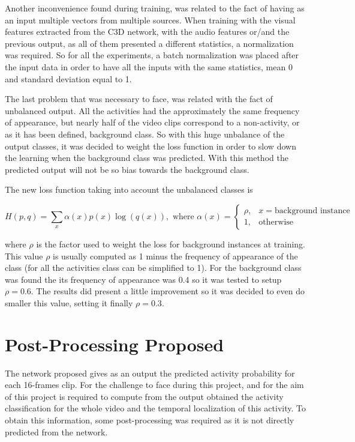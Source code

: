 Another inconvenience found during training, was related to the fact of having as an input multiple vectors from multiple sources. When training with the visual features extracted from the C3D network, with the audio features or/and the previous output, as all of them presented a different statistics, a normalization was required. So for all the experiments, a batch normalization\cite{ioffe2015batch} was placed after the input data in order to have all the inputs with the same statistics, mean 0 and standard deviation equal to 1. 

The last problem that was necessary to face, was related with the fact of unbalanced output. All the activities had the approximately the same frequency of appearance, but nearly half of the video clips correspond to a non-activity, or as it has been defined, background class. So with this huge unbalance of the output classes, it was decided to weight the loss function in order to slow down the learning when the background class was predicted. With this method the predicted output will not be so bias towards the background class.

The new loss function taking into account the unbalanced classes is

\begin{equation}
	H(p,q) = \sum_x \alpha(x) p(x) \log (q(x)), \text{ where } \alpha(x) = 
    \begin{cases}
        \rho, & x = \text{background instance}\\
        1,    & \text{otherwise}
    \end{cases}
\end{equation}

where $\rho$ is the factor used to weight the loss for background instances at training. This value $\rho$ is usually computed as 1 minus the frequency of appearance of the class (for all the activities class can be simplified to 1). For the background class was found the its frequency of appearance was 0.4 so it was tested to setup $\rho = 0.6$. The results did present a little improvement so it was decided to even do smaller this value, setting it finally $\rho = 0.3$.

\section{Post-Processing Proposed}
\label{section:post_processing}

The network proposed gives as an output the predicted activity probability for each 16-frames clip. For the challenge to face during this project, and for the aim of this project is required to compute from the output obtained the activity classification for the whole video and the temporal localization of this activity. To obtain this information, some post-processing was required as it is not directly predicted from the network.

